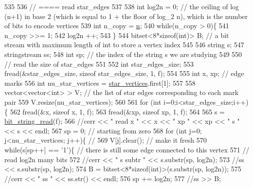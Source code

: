 \begin{DoxyCode}
535 
536   \textcolor{comment}{// ==== read star\_edges}
537 
538   \textcolor{keywordtype}{int} log2n = 0; \textcolor{comment}{// the ceiling of log (n+1) in base 2 (which is equal to 1 + the floor of log\_2 n), which
       is the number of bits to encode vertices}
539   \textcolor{keywordtype}{int} n\_copy = \hyperlink{classmarked__graph__compressed_a8d841016ddb11cfd33748c8deb6277ba}{n};
540   \textcolor{keywordflow}{while}(n\_copy > 0)\{
541     n\_copy >>= 1;
542     log2n ++;
543   \}
544   bitset<8*sizeof(int)> B; \textcolor{comment}{// a bit stream with maximum length of int to store a vertex index}
545 
546   \textcolor{keywordtype}{string} s;
547   stringstream ss;
548   \textcolor{keywordtype}{int} sp; \textcolor{comment}{// the index of the string s we are studying }
549 
550   \textcolor{comment}{// read the size of star\_edges}
551 
552   \textcolor{keywordtype}{int} star\_edges\_size;
553   fread(&star\_edges\_size, \textcolor{keyword}{sizeof} star\_edges\_size, 1, f);
554 
555   \textcolor{keywordtype}{int} x, xp; \textcolor{comment}{// edge marks}
556   \textcolor{keywordtype}{int} nu\_star\_vertices = \hyperlink{classmarked__graph__compressed_a7a4ced4586e2e353f9076bd447df5208}{star\_vertices}.first[1];
557 
558   vector<vector<int> > V; \textcolor{comment}{// the list of star edges corresponding to each mark pair}
559   V.resize(nu\_star\_vertices);
560 
561   \textcolor{keywordflow}{for} (\textcolor{keywordtype}{int} i=0;i<star\_edges\_size;i++)\{
562     fread(&x, \textcolor{keyword}{sizeof} x, 1, f);
563     fread(&xp, \textcolor{keyword}{sizeof} xp, 1, f);
564   
565     s = \hyperlink{compression__helper_8cpp_a40e8dcbc036f96b28e003e882c4890b7}{bit\_string\_read}(f);
566     \textcolor{comment}{//cerr << " read  x " << x << " xp " << xp << " s " << s << endl;}
567     sp = 0; \textcolor{comment}{// starting from zero }
568     \textcolor{keywordflow}{for} (\textcolor{keywordtype}{int} j=0; j<nu\_star\_vertices; j++)\{ \textcolor{comment}{// }
569       V[j].clear(); \textcolor{comment}{// make it fresh}
570       \textcolor{keywordflow}{while}(s[sp++] == \textcolor{charliteral}{'1'})\{ \textcolor{comment}{// there is still some edge connected to this vertex }
571         \textcolor{comment}{// read log2n many bits}
572         \textcolor{comment}{//cerr << " s subtr " << s.substr(sp, log2n);}
573         \textcolor{comment}{//ss << s.substr(sp, log2n);}
574         B = bitset<8*sizeof(int)>(s.substr(sp, log2n));
575         \textcolor{comment}{//cerr << " ss " << ss.str() << endl;}
576         sp += log2n;
577         \textcolor{comment}{//ss >> B;}

\end{DoxyCode}
